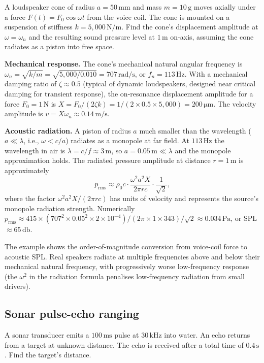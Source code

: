 A loudspeaker cone of radius $a = 50\,\si{\milli\meter}$ and mass
$m = 10\,\si{\gram}$ moves axially under a force $F(t) = F_0 \cos
\omega t$ from the voice coil. The cone is mounted on a suspension
of stiffness $k = 5{,}000\,\si{\newton\per\meter}$. Find the cone's
displacement amplitude at $\omega = \omega_n$ and the resulting
sound pressure level at $1\,\si{\meter}$ on-axis, assuming the cone
radiates as a piston into free space.

\textbf{Mechanical response.} The cone's mechanical natural angular
frequency is $\omega_n = \sqrt{k/m} = \sqrt{5{,}000/0.010} =
707\,\si{\radian\per\second}$, or $f_n = 113\,\si{\hertz}$. With a
mechanical damping ratio of $\zeta \approx 0.5$ (typical of dynamic
loudspeakers, designed near critical damping for transient response),
the on-resonance displacement amplitude for a force $F_0 = 1\,\text{N}$
is $X = F_0/(2\zeta k) = 1/(2 \times 0.5 \times 5{,}000) = 200\,\si{
\micro\meter}$. The velocity amplitude is $v = X\omega_n \approx
0.14\,\si{\meter\per\second}$.

\textbf{Acoustic radiation.} A piston of radius $a$ much smaller than
the wavelength ($a \ll \lambda$, i.e., $\omega < c/a$) radiates as a
monopole at far field. At $113\,\si{\hertz}$ the wavelength in air is
$\lambda = c/f \approx 3\,\si{\meter}$, so $a = 0.05\,\si{\meter} \ll
\lambda$ and the monopole approximation holds. The radiated pressure
amplitude at distance $r = 1\,\si{\meter}$ is approximately
\[
p_{\text{rms}} \approx \rho_0 c \cdot \frac{\omega^2 a^2 X}{2\pi r c}
\cdot \frac{1}{\sqrt{2}},
\]
where the factor $\omega^2 a^2 X / (2\pi r c)$ has units of velocity
and represents the source's monopole radiation strength. Numerically
$p_{\text{rms}} \approx 415 \times (707^2 \times 0.05^2 \times 2 \times
10^{-4})/(2\pi \times 1 \times 343)/\sqrt{2} \approx 0.034\,\si{\pascal}$,
or SPL $\approx 65\,\si{\decibel}$.

The example shows the order-of-magnitude conversion from voice-coil
force to acoustic SPL. Real speakers radiate at multiple frequencies
above and below their mechanical natural frequency, with progressively
worse low-frequency response (the $\omega^2$ in the radiation
formula penalises low-frequency radiation from small drivers).

\subsection{Sonar pulse-echo ranging}

A sonar transducer emits a $100\,\si{\milli\second}$ pulse at $30\,
\si{\kilo\hertz}$ into water. An echo returns from a target at
unknown distance. The echo is received after a total time of $0.4\,\si
{\second}$. Find the target's distance.

